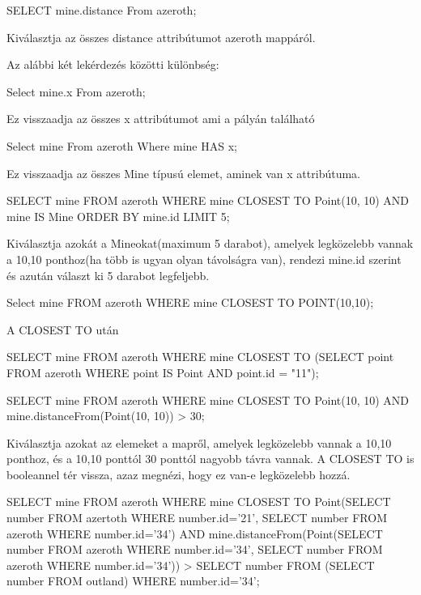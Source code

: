 \begin{sql}
\begin{sql}
SELECT mine.distance From azeroth;
\end{sql}
Kiválasztja az összes distance attribútumot azeroth mappáról.

Az alábbi két lekérdezés közötti különbség:
\begin{sql}
Select mine.x From azeroth; 
\end{sql}
Ez visszaadja az összes x attribútumot ami a pályán található
\begin{sql}
Select mine From azeroth Where mine HAS x;
\end{sql}
Ez visszaadja az összes Mine típusú elemet, aminek van x attribútuma.

\begin{sql}
SELECT mine
FROM azeroth
WHERE mine CLOSEST TO Point(10, 10) AND mine IS Mine
ORDER BY mine.id
LIMIT 5;
\end{sql}
Kiválasztja azokát a Mineokat(maximum 5 darabot), amelyek legközelebb vannak a 10,10 ponthoz(ha több is ugyan olyan távolságra van), 
rendezi mine.id szerint és azután választ ki 5 darabot legfeljebb.

\begin{sql}
Select mine
FROM azeroth
WHERE mine CLOSEST TO POINT(10,10);
\end{sql}
A CLOSEST TO után 

\begin{sql}
SELECT mine
FROM azeroth
WHERE mine CLOSEST TO (SELECT point FROM azeroth WHERE point IS Point AND point.id = "11");
\end{sql}

\begin{sql}
SELECT mine
FROM azeroth
WHERE mine CLOSEST TO Point(10, 10) AND mine.distanceFrom(Point(10, 10)) > 30;
\end{sql}
Kiválasztja azokat az elemeket a mapről, amelyek legközelebb vannak a 10,10 ponthoz, és a 10,10 ponttól 30 ponttól nagyobb távra vannak.
A CLOSEST TO is booleannel tér vissza, azaz megnézi, hogy ez van-e legközelebb hozzá.

\begin{sql}
SELECT mine
FROM azeroth
WHERE mine CLOSEST TO Point(SELECT number FROM azertoth WHERE number.id='21', SELECT number FROM azeroth WHERE number.id='34')
 AND mine.distanceFrom(Point(SELECT number FROM azeroth WHERE number.id='34', SELECT number FROM azeroth WHERE number.id='34')) > SELECT number FROM (SELECT number FROM outland) WHERE number.id='34';
\end{sql}


\end{sql}
